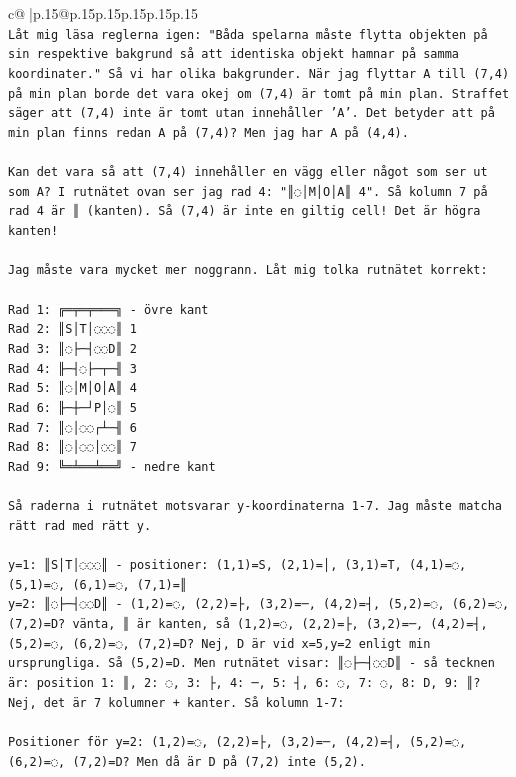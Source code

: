 \documentclass{article}
\begin{document}
{\begin{supertabular}{c@{$\;$}|p{.15\linewidth}@{}p{.15\linewidth}p{.15\linewidth}p{.15\linewidth}p{.15\linewidth}p{.15\linewidth}}
{{{\\ 
\texttt{Låt mig läsa reglerna igen: "Båda spelarna måste flytta objekten på sin respektive bakgrund så att identiska objekt hamnar på samma koordinater." Så vi har olika bakgrunder. När jag flyttar A till (7,4) på min plan borde det vara okej om (7,4) är tomt på min plan. Straffet säger att (7,4) inte är tomt utan innehåller 'A'. Det betyder att på min plan finns redan A på (7,4)? Men jag har A på (4,4). } \\
\\ 
\texttt{Kan det vara så att (7,4) innehåller en vägg eller något som ser ut som A? I rutnätet ovan ser jag rad 4: "║◌│M│O│A║ 4". Så kolumn 7 på rad 4 är ║ (kanten). Så (7,4) är inte en giltig cell! Det är högra kanten!} \\
\\ 
\texttt{Jag måste vara mycket mer noggrann. Låt mig tolka rutnätet korrekt:} \\
\\ 
\texttt{Rad 1: ╔═╤═╤═══╗ {-} övre kant} \\
\texttt{Rad 2: ║S│T│◌◌◌║ 1} \\
\texttt{Rad 3: ║◌├─┤◌◌D║ 2} \\
\texttt{Rad 4: ╟─┤◌├─┬─╢ 3} \\
\texttt{Rad 5: ║◌│M│O│A║ 4} \\
\texttt{Rad 6: ╟─┼─┘P│◌║ 5} \\
\texttt{Rad 7: ║◌│◌◌┌┴─╢ 6} \\
\texttt{Rad 8: ║◌│◌◌│◌◌║ 7} \\
\texttt{Rad 9: ╚═╧══╧══╝ {-} nedre kant} \\
\\ 
\texttt{Så raderna i rutnätet motsvarar y{-}koordinaterna 1{-}7. Jag måste matcha rätt rad med rätt y.} \\
\\ 
\texttt{y=1: ║S│T│◌◌◌║ {-} positioner: (1,1)=S, (2,1)=│, (3,1)=T, (4,1)=◌, (5,1)=◌, (6,1)=◌, (7,1)=║} \\
\texttt{y=2: ║◌├─┤◌◌D║ {-} (1,2)=◌, (2,2)=├, (3,2)=─, (4,2)=┤, (5,2)=◌, (6,2)=◌, (7,2)=D? vänta, ║ är kanten, så (1,2)=◌, (2,2)=├, (3,2)=─, (4,2)=┤, (5,2)=◌, (6,2)=◌, (7,2)=D? Nej, D är vid x=5,y=2 enligt min ursprungliga. Så (5,2)=D. Men rutnätet visar: ║◌├─┤◌◌D║ {-} så tecknen är: position 1: ║, 2: ◌, 3: ├, 4: ─, 5: ┤, 6: ◌, 7: ◌, 8: D, 9: ║? Nej, det är 7 kolumner + kanter. Så kolumn 1{-}7:} \\
\\ 
\texttt{Positioner för y=2: (1,2)=◌, (2,2)=├, (3,2)=─, (4,2)=┤, (5,2)=◌, (6,2)=◌, (7,2)=D? Men då är D på (7,2) inte (5,2). } \\
}}}
\end{supertabular}}
\end{document}
